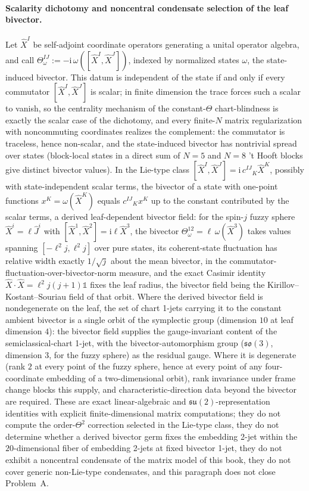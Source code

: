 \paragraph{Scalarity dichotomy and noncentral condensate selection of the leaf bivector.} Let \(\hat X^I\) be self-adjoint coordinate operators generating a unital operator algebra, and call \(\Theta^{IJ}_\omega:=-\mathrm i\,\omega([\hat X^I,\hat X^J])\), indexed by normalized states \(\omega\), the state-induced bivector. This datum is independent of the state if and only if every commutator \([\hat X^I,\hat X^J]\) is scalar; in finite dimension the trace forces such a scalar to vanish, so the centrality mechanism of the constant-\(\Theta\) chart-blindness is exactly the scalar case of the dichotomy, and every finite-\(N\) matrix regularization with noncommuting coordinates realizes the complement: the commutator is traceless, hence non-scalar, and the state-induced bivector has nontrivial spread over states (block-local states in a direct sum of \(N=5\) and \(N=8\) 't Hooft blocks give distinct bivector values). In the Lie-type class \([\hat X^I,\hat X^J]=\mathrm i\,c^{IJ}{}_K\hat X^K\), possibly with state-independent scalar terms, the bivector of a state with one-point functions \(x^K=\omega(\hat X^K)\) equals \(c^{IJ}{}_Kx^K\) up to the constant contributed by the scalar terms, a derived leaf-dependent bivector field: for the spin-\(j\) fuzzy sphere \(\hat X^i=\ell\hat J^i\) with \([\hat X^1,\hat X^2]=\mathrm i\ell\hat X^3\), the bivector \(\Theta^{12}_\omega=\ell\,\omega(\hat X^3)\) takes values spanning \([-\ell^2 j,\ell^2 j]\) over pure states, its coherent-state fluctuation has relative width exactly \(1/\sqrt j\) about the mean bivector, in the commutator-fluctuation-over-bivector-norm measure, and the exact Casimir identity \(\hat X\cdot\hat X=\ell^2 j(j+1)\mathbb 1\) fixes the leaf radius, the bivector field being the Kirillov--Kostant--Souriau field of that orbit. Where the derived bivector field is nondegenerate on the leaf, the set of chart 1-jets carrying it to the constant ambient bivector is a single orbit of the symplectic group (dimension \(10\) at leaf dimension \(4\)): the bivector field supplies the gauge-invariant content of the semiclassical-chart 1-jet, with the bivector-automorphism group (\(\mathfrak{so}(3)\), dimension \(3\), for the fuzzy sphere) as the residual gauge. Where it is degenerate (rank \(2\) at every point of the fuzzy sphere, hence at every point of any four-coordinate embedding of a two-dimensional orbit), rank invariance under frame change blocks this supply, and characteristic-direction data beyond the bivector are required. These are exact linear-algebraic and \(\mathfrak{su}(2)\)-representation identities with explicit finite-dimensional matrix computations; they do not compute the order-\(\Theta^2\) correction selected in the Lie-type class, they do not determine whether a derived bivector germ fixes the embedding 2-jet within the \(20\)-dimensional fiber of embedding 2-jets at fixed bivector 1-jet, they do not exhibit a noncentral condensate of the matrix model of this book, they do not cover generic non-Lie-type condensates, and this paragraph does not close Problem~A.

